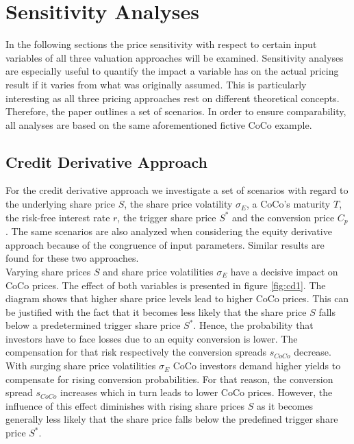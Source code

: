 \chapter{Sensitivity Analyses}
In the following sections the price sensitivity with respect to certain input variables of all three valuation approaches will be examined. Sensitivity analyses are especially useful to quantify the impact a variable has on the actual pricing result if it varies from what was originally assumed. This is particularly interesting as all three pricing approaches rest on different theoretical concepts. Therefore, the paper outlines a set of scenarios. In order to ensure comparability, all analyses are based on the same aforementioned fictive CoCo example. 

\section{Credit Derivative Approach}\label{sensicredit}

For the credit derivative approach we investigate a set of scenarios with regard to the underlying share price $S$, the share price volatility $\sigma_E$, a CoCo's maturity $T$, the risk-free interest rate $r$, the trigger share price $S^*$ and the conversion price $C_p$. The same scenarios are also analyzed when considering the equity derivative approach because of the congruence of input parameters. Similar results are found for these two approaches.\\

Varying share prices $S$ and share price volatilities $\sigma_E$ have a decisive impact on CoCo prices. The effect of both variables is presented in figure \ref{fig:cd1}. The diagram shows that higher share price levels lead to higher CoCo prices. This can be justified with the fact that it becomes less likely that the share price $S$ falls below a predetermined trigger share price $S^*$. Hence, the probability that investors have to face losses due to an equity conversion is lower. The compensation for that risk respectively the conversion spreads $s_{CoCo}$ decrease. With surging share price volatilities $\sigma_E$ CoCo investors demand higher yields to compensate for rising conversion probabilities. For that reason, the conversion spread $s_{CoCo}$ increases which in turn leads to lower CoCo prices. However, the influence of this effect diminishes with rising share prices $S$ as it becomes generally less likely that the share price falls below the predefined trigger share price $S^*$.\\


